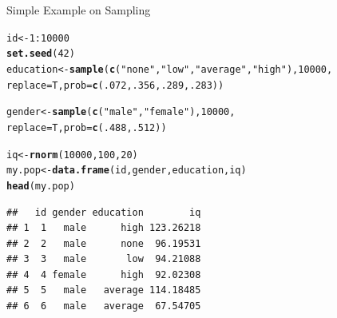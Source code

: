 \documentclass[11pt,german,hideothersubsections]{beamer}\usepackage[]{graphicx}\usepackage[]{color}
\makeatletter
\newcommand{\hlnum}[1]{\textcolor[rgb]{0.686,0.059,0.569}{#1}}%
\newcommand{\hlstr}[1]{\textcolor[rgb]{0.192,0.494,0.8}{#1}}%
\newcommand{\hlopt}[1]{\textcolor[rgb]{0,0,0}{#1}}%
\newcommand{\hlstd}[1]{\textcolor[rgb]{0.345,0.345,0.345}{#1}}%
\newcommand{\hlkwb}[1]{\textcolor[rgb]{0.69,0.353,0.396}{#1}}%
\newcommand{\hlkwc}[1]{\textcolor[rgb]{0.333,0.667,0.333}{#1}}%
\newcommand{\hlkwd}[1]{\textcolor[rgb]{0.737,0.353,0.396}{\textbf{#1}}}%
\newenvironment{kframe}{%
 \def\at@end@of@kframe{}%
 \ifinner\ifhmode%
  \def\at@end@of@kframe{\end{minipage}}%
  \begin{minipage}{\columnwidth}%
 \fi\fi%
 \def\FrameCommand##1{\hskip\@totalleftmargin \hskip-\fboxsep
 \colorbox{shadecolor}{##1}\hskip-\fboxsep
     \hskip-\linewidth \hskip-\@totalleftmargin \hskip\columnwidth}%
 \MakeFramed {\advance\hsize-\width
   \@totalleftmargin\z@ \linewidth\hsize
   \@setminipage}}%
 {\par\unskip\endMakeFramed%
 \at@end@of@kframe}
\newenvironment{knitrout}{}{} %
\makeatother
\begin{document}
\begin{frame}[fragile]{Simple Example on Sampling}
\begin{footnotesize}
\begin{knitrout}
\color{fgcolor}\begin{kframe}
\begin{alltt}
\hlstd{id} \hlkwb{<-} \hlnum{1}\hlopt{:}\hlnum{10000}
\hlkwd{set.seed}\hlstd{(}\hlnum{42}\hlstd{)}
\hlstd{education} \hlkwb{<-} \hlkwd{sample}\hlstd{(}\hlkwd{c}\hlstd{(}\hlstr{"none"}\hlstd{,}\hlstr{"low"}\hlstd{,}\hlstr{"average"}\hlstd{,}\hlstr{"high"}\hlstd{),}\hlnum{10000}\hlstd{,}
                    \hlkwc{replace} \hlstd{= T,}\hlkwc{prob} \hlstd{=} \hlkwd{c}\hlstd{(}\hlnum{.072}\hlstd{,}\hlnum{.356}\hlstd{,}\hlnum{.289}\hlstd{,}\hlnum{.283}\hlstd{))}

\hlstd{gender} \hlkwb{<-} \hlkwd{sample}\hlstd{(}\hlkwd{c}\hlstd{(}\hlstr{"male"}\hlstd{,}\hlstr{"female"}\hlstd{),}\hlnum{10000}\hlstd{,}
                 \hlkwc{replace} \hlstd{= T,}\hlkwc{prob} \hlstd{=} \hlkwd{c}\hlstd{(}\hlnum{.488}\hlstd{,}\hlnum{.512}\hlstd{))}

\hlstd{iq} \hlkwb{<-} \hlkwd{rnorm}\hlstd{(}\hlnum{10000}\hlstd{,}\hlnum{100}\hlstd{,}\hlnum{20}\hlstd{)}
\hlstd{my.pop} \hlkwb{<-} \hlkwd{data.frame}\hlstd{(id,gender,education,iq)}
\hlkwd{head}\hlstd{(my.pop)}
\end{alltt}
\begin{verbatim}
##   id gender education        iq
## 1  1   male      high 123.26218
## 2  2   male      none  96.19531
## 3  3   male       low  94.21088
## 4  4 female      high  92.02308
## 5  5   male   average 114.18485
## 6  6   male   average  67.54705
\end{verbatim}
\end{kframe}
\end{knitrout}
\end{footnotesize}
\end{frame}
\end{document}
